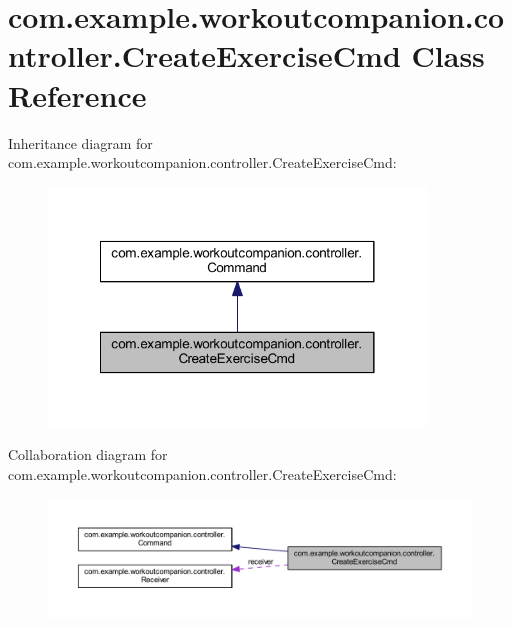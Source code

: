 \hypertarget{classcom_1_1example_1_1workoutcompanion_1_1controller_1_1_create_exercise_cmd}{\section{com.\-example.\-workoutcompanion.\-controller.\-Create\-Exercise\-Cmd Class Reference}
\label{classcom_1_1example_1_1workoutcompanion_1_1controller_1_1_create_exercise_cmd}
}


Inheritance diagram for com.\-example.\-workoutcompanion.\-controller.\-Create\-Exercise\-Cmd\-:\nopagebreak
\begin{figure}[H]
\begin{center}
\leavevmode
\includegraphics[width=284pt]{classcom_1_1example_1_1workoutcompanion_1_1controller_1_1_create_exercise_cmd__inherit__graph}
\end{center}
\end{figure}


Collaboration diagram for com.\-example.\-workoutcompanion.\-controller.\-Create\-Exercise\-Cmd\-:\nopagebreak
\begin{figure}[H]
\begin{center}
\leavevmode
\includegraphics[width=350pt]{classcom_1_1example_1_1workoutcompanion_1_1controller_1_1_create_exercise_cmd__coll__graph}
\end{center}
\end{figure}
